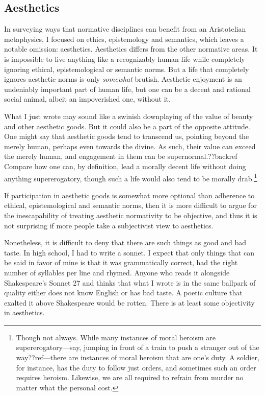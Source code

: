 \subsection{Aesthetics}
In surveying ways that normative disciplines can benefit from an Aristotelian metaphysics, I focused on 
ethics, epistemology and semantics, which leaves a notable omission: aesthetics. Aesthetics differs from
the other normative areas. It is impossible to live anything like a recognizably human 
life while completely ignoring ethical, epistemological or semantic norms. But a life that completely ignores 
aesthetic norms is only \textit{somewhat} brutish. Aesthetic enjoyment is an undeniably important part of 
human life, but one can be a decent and rational social animal, albeit an impoverished one, without it. 

What I just wrote may sound like a swinish downplaying of the value of beauty and other aesthetic
goods. But it could also be a part of the opposite attitude. One might say that aesthetic goods tend to 
transcend us, pointing beyond the merely human, perhaps even towards the divine. As such, their value can
exceed the merely human, and engagement in them can be supernormal.??backref Compare how one can, by definition,
lead a morally decent life without doing anything supererogatory, though such a life would also tend to be
morally drab.\footnote{Though not always. While many instances of moral heroism are supererogatory---say, 
jumping in front of a train to push a stranger out of the way??ref---there are instances of moral heroism
that are one's duty. A soldier, for instance, has the duty to follow just orders, and sometimes such an order
requires heroism. Likewise, we are all required to refrain from murder no matter what the personal cost.}

If participation in aesthetic goods is somewhat more optional than adherence to ethical, epistemological
and semantic norms, then it is more difficult to argue for the inescapability of treating aesthetic normativity
to be objective, and thus it is not surprising if more people take a subjectivist view to aesthetics.

Nonetheless, it is difficult to deny that there are such things as good and bad taste. In high school, I had
to write a sonnet. I expect that only things that can be said in favor of mine is that it was grammatically
correct, had the right number of syllables per line and rhymed. Anyone who reads it alongside Shakespeare's 
Sonnet 27 and thinks that what I wrote is in the same ballpark of quality either does not know English or has bad taste. A poetic culture 
that exalted it above Shakespeare would be rotten.  There is at least some objectivity in aesthetics.


